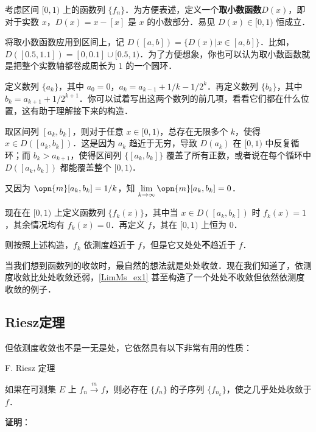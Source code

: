 \begin{example}{}\label{LimMs_ex1}

考虑区间 $[0, 1)$ 上的函数列 $\{f_n\}$．为方便表述，定义一个\textbf{取小数函数}$D(x)$，即对于实数 $x$，$D(x)=x-[x]$ 是 $x$ 的小数部分．易见 $D(x)\in [0, 1)$ 恒成立．

将取小数函数应用到区间上，记 $D([a, b])=\{D(x)|x\in[a, b]\}$．比如，$D([0.5, 1.1])=[0, 0.1]\cup[0.5, 1)$．为了方便想象，你也可以认为取小数函数就是把整个实数轴都卷成周长为 $1$ 的一个圆环．

定义数列 $\{a_k\}$，其中 $a_0=0$，$a_k=a_{k-1}+1/k-1/2^k$．再定义数列 $\{b_k\}$，其中 $b_k=a_{k+1}+1/2^{k+1}$．你可以试着写出这两个数列的前几项，看看它们都在什么位置，这有助于理解接下来的构造．

取区间列 $[a_k, b_k]$，则对于任意 $x\in[0, 1)$，总存在无限多个 $k$，使得 $x\in D([a_k, b_k])$．这是因为 $a_k$ 趋近于无穷，导致 $D(a_k)$ 在 $[0, 1)$ 中反复循环；而 $b_k>a_{k+1}$，使得区间列 $\{[a_k, b_k]\}$ 覆盖了所有正数，或者说在每个循环中 $D([a_k, b_k])$ 都能覆盖整个 $[0, 1)$．

又因为 $\opn{m}[a_k, b_k]=1/k$，知 $\lim\limits_{k\to \infty}\opn{m}[a_k, b_k]=0$．

现在在 $[0, 1)$ 上定义函数列 $\{f_k(x)\}$，其中当 $x\in D([a_k, b_k])$ 时 $f_k(x)=1$，其余情况均有 $f_k(x)=0$．再定义 $f$，其在 $[0, 1)$ 上恒为 $0$．

则按照上述构造，$f_k$ 依测度趋近于 $f$，但是它又处处\textbf{不}趋近于 $f$．

\end{example}

当我们想到函数列的收敛时，最自然的想法就是处处收敛．现在我们知道了，依测度收敛比处处收敛还弱，\autoref{LimMs_ex1} 甚至构造了一个处处不收敛但依然依测度收敛的例子．


\subsection{Riesz定理}



但依测度收敛也不是一无是处，它依然具有以下非常有用的性质：

\begin{theorem}{F. Riesz 定理}

如果在可测集 $E$ 上 $f_n\overset{m}\to f$，则必存在 $\{f_n\}$ 的子序列 $\{f_{n_k}\}$，使之几乎处处收敛于 $f$．

\end{theorem}

\textbf{证明}：

